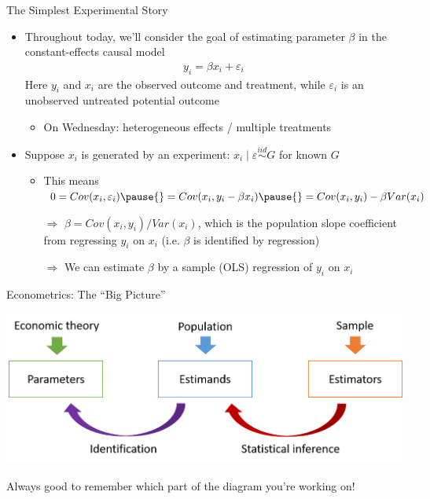\documentclass[11pt,english]{beamer}
\begin{document}
\begin{frame}{The Simplest Experimental Story}
\begin{itemize}
\item Throughout today, we'll consider the goal of estimating parameter $\beta$ in the constant-effects causal model
\begin{align*}
y_i = \beta x_i + \varepsilon_i
\end{align*}
Here $y_i$ and $x_i$ are the observed outcome and treatment, while $\varepsilon_i$ is an unobserved untreated potential outcome\smallskip\pause{}
\begin{itemize}
\item On Wednesday: heterogeneous effects / multiple treatments
\end{itemize}\medskip\pause{}
\item Suppose $x_i$ is generated by an experiment: $x_i\mid \varepsilon \stackrel{iid}{\sim} G$ for known $G$\smallskip\pause{}
\begin{itemize}
\item This means $0=Cov(x_i,\varepsilon_i)\pause{}=Cov(x_i,y_i-\beta x_i)\pause{}=Cov(x_i,y_i)-\beta Var(x_i)$\smallskip\pause{}
\item[$\Rightarrow$] $\beta=Cov(x_i,y_i)/Var(x_i)$, which is the population slope coefficient from regressing $y_i$ on $x_i$ (i.e. $\beta$ is identified by regression)\smallskip\pause{}
\item[$\Rightarrow$] We can estimate $\beta$ by a sample (OLS) regression of $y_i$ on $x_i$
\end{itemize}
\end{itemize}
\end{frame}

\begin{frame}{Econometrics: The ``Big Picture''}

\includegraphics[width=1\textwidth]{figures/BigPicture.png}
\medskip

\begin{center}
Always good to remember which part of the diagram you're working on!
\end{center}

\end{frame}
\end{document}
